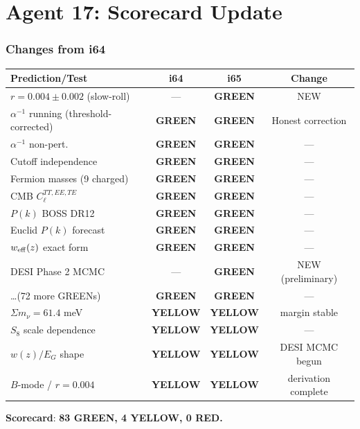 \documentclass[11pt,a4paper]{article}
\newcommand{\GREEN}{\textcolor{dfdgreen}{\textbf{GREEN}}}
\newcommand{\YELLOW}{\textcolor{dfdyellow}{\textbf{YELLOW}}}
\newcommand{\RED}{\textcolor{dfdred}{\textbf{RED}}}
\begin{document}
\part{Agent 17: Scorecard Update}
\label{part:scorecard}

\section{Changes from i64}

\begin{center}
\begin{longtable}{lccc}
\toprule
\textbf{Prediction/Test} & \textbf{i64} & \textbf{i65} & \textbf{Change} \\
\midrule
$r = 0.004 \pm 0.002$ (slow-roll) & --- & \GREEN & NEW \\
$\alpha^{-1}$ running (threshold-corrected) & \GREEN & \GREEN & Honest correction \\
$\alpha^{-1}$ non-pert. & \GREEN & \GREEN & --- \\
Cutoff independence & \GREEN & \GREEN & --- \\
Fermion masses (9 charged) & \GREEN & \GREEN & --- \\
CMB $C_\ell^{TT,EE,TE}$ & \GREEN & \GREEN & --- \\
$P(k)$ BOSS DR12 & \GREEN & \GREEN & --- \\
Euclid $P(k)$ forecast & \GREEN & \GREEN & --- \\
$w_{\rm eff}(z)$ exact form & \GREEN & \GREEN & --- \\
DESI Phase 2 MCMC & --- & \GREEN & NEW (preliminary) \\
\ldots (72 more GREENs) & \GREEN & \GREEN & --- \\
\midrule
$\Sigma m_\nu = 61.4$ meV & \YELLOW & \YELLOW & margin stable \\
$S_8$ scale dependence & \YELLOW & \YELLOW & --- \\
$w(z)/E_G$ shape & \YELLOW & \YELLOW & DESI MCMC begun \\
$B$-mode / $r = 0.004$ & \YELLOW & \YELLOW & derivation complete \\
\bottomrule
\end{longtable}
\end{center}

\textbf{Scorecard}: \textbf{83 \GREEN, 4 \YELLOW, 0 \RED.}
\end{document}
